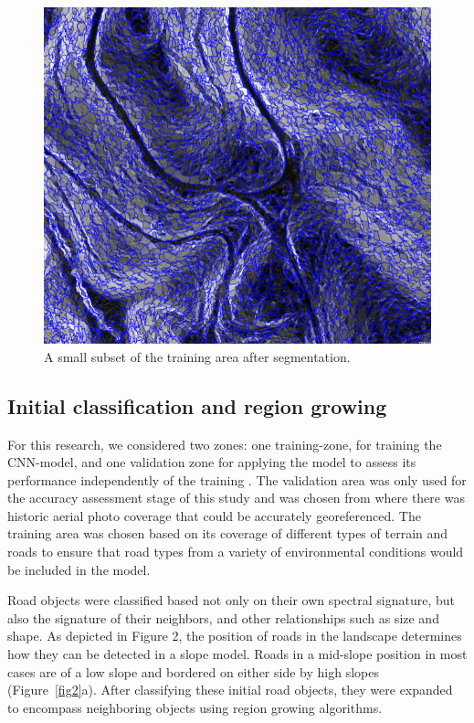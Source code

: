 \documentclass[remotesensing,article,submit,pdftex,moreauthors]{Definitions/mdpi}
\begin{document}
\begin{figure}[H]
\includegraphics[width=10.5 cm]{segment.png}
\caption{A small subset of the training area after segmentation.  \label{fig4}}
\end{figure}   


\subsection{Initial classification and region growing}


For this research, we considered two zones: one training-zone, for training the CNN-model, and one validation zone for applying the model to assess its performance independently of the training \cite{navulur, prakash}. The validation area was only used for the accuracy assessment stage of this study and was chosen from where there was historic aerial photo coverage that could be accurately georeferenced. The training area was chosen based on its coverage of different types of terrain and roads to ensure that road types from a variety of environmental conditions would be included in the model.

Road objects were classified based not only on their own spectral signature, but also the signature of their neighbors, and other relationships such as size and shape. As depicted in Figure 2, the position of roads in the landscape determines how they can be detected in a slope model. Roads in a mid-slope position in most cases are of a low slope and bordered on either side by high slopes (Figure~\ref{fig2}a). After classifying these initial road objects, they were expanded to encompass neighboring objects using region growing algorithms.
\end{document}
